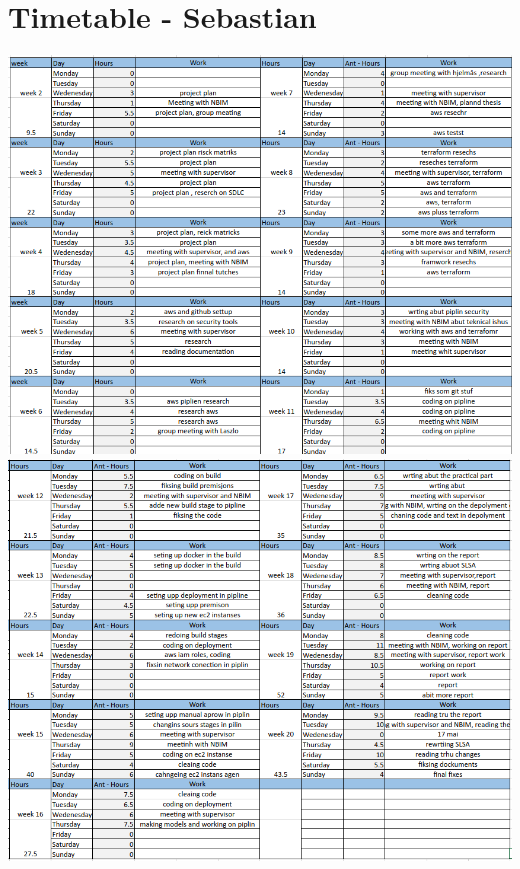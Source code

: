 \section{Timetable - Sebastian}
\vspace{3cm}
\includegraphics[width=\textwidth]{Images/sebastiantimer1.png}
\newpage
\vspace{3cm}
\includegraphics[width=\textwidth]{Images/sebastiantimer2.png}
\newpage
